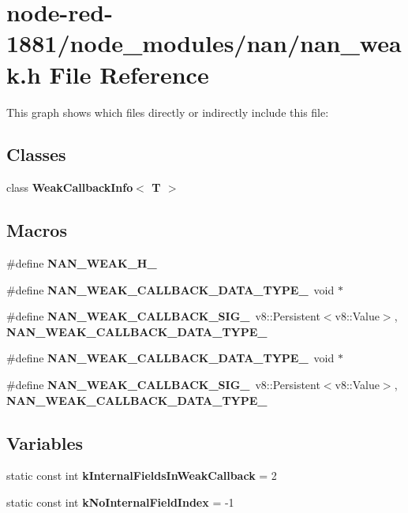 \section{node-\/red-\/1881/node\+\_\+modules/nan/nan\+\_\+weak.h File Reference}
\label{nan__weak_8h}
This graph shows which files directly or indirectly include this file\+:
\subsection*{Classes}
\begin{DoxyCompactItemize}
\item 
class \textbf{ Weak\+Callback\+Info$<$ T $>$}
\end{DoxyCompactItemize}
\subsection*{Macros}
\begin{DoxyCompactItemize}
\item 
\#define \textbf{ N\+A\+N\+\_\+\+W\+E\+A\+K\+\_\+\+H\+\_\+}
\item 
\#define \textbf{ N\+A\+N\+\_\+\+W\+E\+A\+K\+\_\+\+C\+A\+L\+L\+B\+A\+C\+K\+\_\+\+D\+A\+T\+A\+\_\+\+T\+Y\+P\+E\+\_\+}~void $\ast$
\item 
\#define \textbf{ N\+A\+N\+\_\+\+W\+E\+A\+K\+\_\+\+C\+A\+L\+L\+B\+A\+C\+K\+\_\+\+S\+I\+G\+\_\+}~v8\+::\+Persistent$<$v8\+::\+Value$>$, \textbf{ N\+A\+N\+\_\+\+W\+E\+A\+K\+\_\+\+C\+A\+L\+L\+B\+A\+C\+K\+\_\+\+D\+A\+T\+A\+\_\+\+T\+Y\+P\+E\+\_\+}
\item 
\#define \textbf{ N\+A\+N\+\_\+\+W\+E\+A\+K\+\_\+\+C\+A\+L\+L\+B\+A\+C\+K\+\_\+\+D\+A\+T\+A\+\_\+\+T\+Y\+P\+E\+\_\+}~void $\ast$
\item 
\#define \textbf{ N\+A\+N\+\_\+\+W\+E\+A\+K\+\_\+\+C\+A\+L\+L\+B\+A\+C\+K\+\_\+\+S\+I\+G\+\_\+}~v8\+::\+Persistent$<$v8\+::\+Value$>$, \textbf{ N\+A\+N\+\_\+\+W\+E\+A\+K\+\_\+\+C\+A\+L\+L\+B\+A\+C\+K\+\_\+\+D\+A\+T\+A\+\_\+\+T\+Y\+P\+E\+\_\+}
\end{DoxyCompactItemize}
\subsection*{Variables}
\begin{DoxyCompactItemize}
\item 
static const int \textbf{ k\+Internal\+Fields\+In\+Weak\+Callback} = 2
\item 
static const int \textbf{ k\+No\+Internal\+Field\+Index} = -\/1
\end{DoxyCompactItemize}


